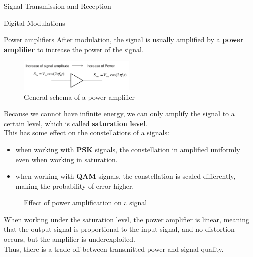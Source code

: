 \begin{section}{Signal Transmission and Reception}
\begin{subsection}{Digital Modulations}
    \begin{subsubsection}{Power amplifiers}
      After modulation, the signal is usually amplified by a \textbf{power amplifier} to increase
      the power of the signal.\\
      \begin{figure}[h]
        \centering
        \includegraphics[width=0.5\textwidth]{img/wireless/power amplifier.png}
        \caption{General schema of a power amplifier}
        \label{fig:power amplifier}
      \end{figure}
      Because we cannot have infinite energy, we can only amplify the signal to a certain level, 
      which is called \textbf{saturation level}.\\
      This has some effect on the constellations of a signals:
      \begin{itemize}
        \item when working with \textbf{PSK} signals, the constellation in amplified uniformly
          even when working in saturation.
        \item when working with \textbf{QAM} signals, the constellation is scaled differently, 
          making the probability of error higher.
      \end{itemize}

      \begin{figure}[h]
        \centering
        \hfill
        \caption{Effect of power amplification on a signal}
        \label{fig:constellation after amplification}
      \end{figure}
      When working under the saturation level, the power amplifier is linear, meaning that the
      output signal is proportional to the input signal, and no distortion occurs, but the 
      amplifier is underexploited.\\
      Thus, there is a trade-off between transmitted power and signal quality.\\
      

\end{subsubsection}
\end{subsection}
\end{section}
